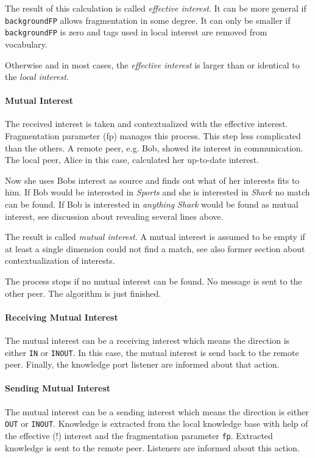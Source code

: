 {The result of this calculation is called {\it effective interest}. It can be more general if {\tt backgroundFP} allows fragmentation in some degree. It can only be smaller if {\tt backgroundFP} is zero and tags used in local interest are removed from vocabulary.

Otherwise and in most cases, the {\it effective interest} is larger than or identical to the {\it local interest}.

\paragraph{Mutual Interest}
The received interest is taken and contextualized with the effective interest. Fragmentation parameter (fp) manages this process. This step less complicated than the others. A remote peer, e.g. Bob, showed its interest in communication. The local peer, Alice in this case, calculated her up-to-date interest.

Now she uses Bobs interest as source and finds out what of her interests fits to him. If Bob would be interested in {\it Sports} and she is interested in {\it Shark} no match can be found. If Bob is interested in {\it anything} {\it Shark} would be found as mutual interest, see discussion about revealing several lines above.

The result is called {\it mutual interest}. A mutual interest is assumed to be empty if at least a single dimension could not find a match, see also former section about contextualization of interests.

The process stops if no mutual interest can be found. No message is sent to the other peer. The algorithm is just finished.

\paragraph{Receiving Mutual Interest}
The mutual interest can be a receiving interest which means the direction is either {\tt IN} or {\tt INOUT}. In this case, the mutual interest is send back to the remote peer. Finally, the knowledge port listener are informed about that action.

\paragraph{Sending Mutual Interest}
The mutual interest can be a sending interest which means the direction is either {\tt OUT} or {\tt INOUT}. Knowledge is extracted from the local knowledge base with help of the effective (!) interest and the fragmentation parameter {\tt fp}. Extracted knowledge is sent to the remote peer. Listeners are informed about this action.

}
